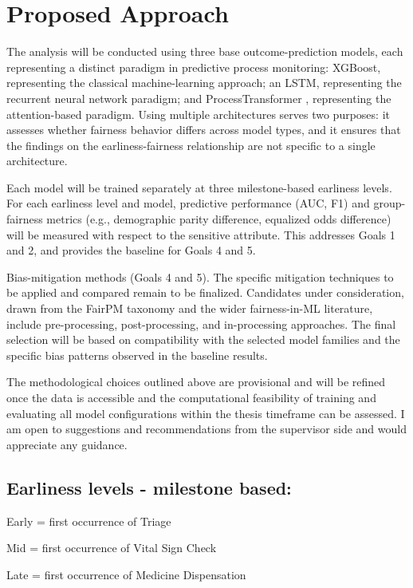 \documentclass[authoryear,preprint,12pt]{elsarticle}
\begin{document}
\section{Proposed Approach}
The analysis will be conducted using three base outcome-prediction models, each representing a distinct paradigm in predictive process monitoring: XGBoost, representing the classical machine-learning approach; an LSTM, representing the recurrent neural network paradigm; and ProcessTransformer \citep{Bukhsh2021ProcessTransformerPB}, representing the attention-based paradigm. Using multiple architectures serves two purposes: it assesses whether fairness behavior differs across model types, and it ensures that the findings on the earliness-fairness relationship are not specific to a single architecture.

Each model will be trained separately at three milestone-based earliness levels. For each earliness level and model, predictive performance (AUC, F1) and group-fairness metrics (e.g., demographic parity difference, equalized odds difference) will be measured with respect to the sensitive attribute. This addresses Goals 1 and 2, and provides the baseline for Goals 4 and 5.

Bias-mitigation methods (Goals 4 and 5). The specific mitigation techniques to be applied and compared remain to be finalized. Candidates under consideration, drawn from the FairPM taxonomy \citep{Revoredo2025FairPM} and the wider fairness-in-ML literature, include pre-processing, post-processing, and in-processing approaches. The final selection will be based on compatibility with the selected model families and the specific bias patterns observed in the baseline results.

The methodological choices outlined above are provisional and will be refined once the data is accessible and the computational feasibility of training and evaluating all model configurations within the thesis timeframe can be assessed. I am open to suggestions and recommendations from the supervisor side and would appreciate any guidance.


\subsection{\textbf{Earliness levels - milestone based:}}

Early = first occurrence of Triage

Mid = first occurrence of Vital Sign Check

Late = first occurrence of Medicine Dispensation 
\end{document}
